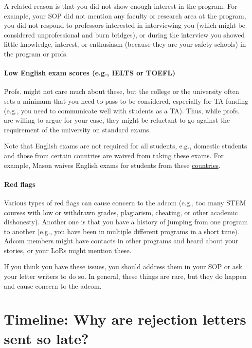 \documentclass[oneside,11pt,dvipsnames]{book}
\begin{document}
A related reason is that you did not show enough interest in the program.
For example, your SOP did not mention any faculty or research area at the program, you did not respond to professors interested in interviewing you (which might be considered unprofessional and burn bridges), or during the interview you showed little knowledge, interest, or enthusiasm (because they are your safety schools) in the program or profs.


\paragraph{Low English exam scores (e.g., IELTS or TOEFL)}  Profs. might not care much about these, but the college or the university often sets a minimum that you need to pass to be considered, especially for TA funding (e.g., you need to communicate well with students as a TA).  Thus, while profs. are willing to argue for your case, they might be reluctant to go against the requirement of the university on standard exams.  

Note that English exams are not required for all students, e.g., domestic students and those from certain countries are waived from taking these exams.  For example, Mason waives English exams for students from these \href{https://github.com/dynaroars/dynaroars.github.io/wiki/About-Mason#standard-tests-waiver-eligible-countries}{countries}.


\paragraph{Red flags} Various types of red flags can cause concern to the adcom (e.g., too many STEM courses with low or withdrawn grades, plagiarism, cheating, or other academic dishonesty). Another one is that you have a history of jumping from one program to another (e.g., you have been in multiple different programs in a short time). Adcom members might have contacts in other programs and heard about your stories, or your LoRs might mention these.

If you think you have these issues, you should address them in your SOP or ask your letter writers to do so.
In general, these things are rare, but they do happen and cause concern to the adcom.


\section{Timeline: Why are rejection letters sent so late?}\label{sec:late-rejection}
\end{document}
